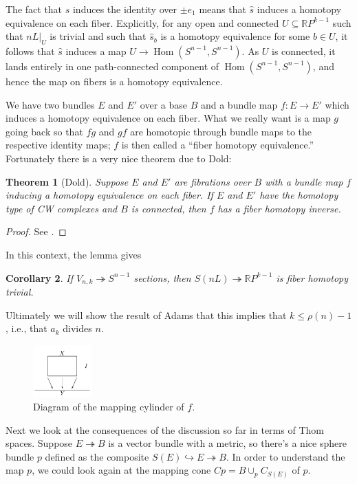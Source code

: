 \documentclass{article}
\newcommand{\R}{\mathbb{R}}
\newcommand{\RP}{\R P}
\newcommand{\into}{\hookrightarrow}
\newcommand{\onto}{\twoheadrightarrow}
\DeclareMathOperator{\Hom}{Hom}
\newtheorem{thm}{Theorem}[section]
\newtheorem{cor}[thm]{Corollary}
\begin{document}
The fact that $\hat s$ induces the identity over $\pm e_1$ means that $\hat s$ induces a homotopy equivalence on each fiber.  Explicitly, for any open and connected $U \subseteq \RP^{k-1}$ such that $nL|_U$ is trivial and such that $\hat s_b$ is a homotopy equivalence for some $b \in U$, it follows that $\hat s$ induces a map $U \to \Hom(S^{n-1}, S^{n-1})$.  As $U$ is connected, it lands entirely in one path-connected component of $\Hom(S^{n-1}, S^{n-1})$, and hence the map on fibers is a homotopy equivalence.

We have two bundles $E$ and $E'$ over a base $B$ and a bundle map $f: E \to E'$ which induces a homotopy equivalence on each fiber.  What we really want is a map $g$ going back so that $fg$ and $gf$ are homotopic through bundle maps to the respective identity maps;  $f$ is then called a ``fiber homotopy equivalence.''  Fortunately there is a very nice theorem due to Dold:
\begin{thm}[Dold]\label{LemmaOfDold}
Suppose $E$ and $E'$ are fibrations over $B$ with a bundle map $f$ inducing a homotopy equivalence on each fiber.  If $E$ and $E'$ have the homotopy type of CW complexes and $B$ is connected, then $f$ has a fiber homotopy inverse.
\end{thm}
\begin{proof}
See \cite{James}.
\end{proof}
In this context, the lemma gives
\begin{cor}
If $V_{n, k} \onto S^{n-1}$ sections, then $S(nL) \onto \RP^{k-1}$ is fiber homotopy trivial.
\end{cor}
Ultimately we will show the result of Adams that this implies that $k \le \rho(n) - 1$, i.e., that $a_k$ divides $n$.


\begin{figure}
\centering\includegraphics[width=0.2\textwidth]{figures/fig7.pdf}
\caption{\small Diagram of the mapping cylinder of $f$.}
\end{figure} %
Next we look at the consequences of the discussion so far in terms of Thom spaces.  Suppose $E \onto B$ is a vector bundle with a metric, so there's a nice sphere bundle $p$ defined as the composite $S(E) \into E \onto B$.  In order to understand the map $p$, we could look again at the mapping cone $Cp = B \cup_p C_{S(E)}$ of $p$.  
\end{document}
